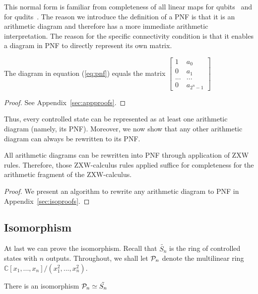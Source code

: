 This normal form is familiar from completeness of all linear maps for qubits~\cite{Hadzihasanovic2018zwzxcomplete} and for qudits~\cite{poor2023completeness}. The reason we introduce the definition of a PNF is that it is an arithmetic diagram and therefore has a more immediate arithmetic interpretation. The reason for the specific connectivity condition is that it enables a diagram in PNF to directly represent its own matrix.

\begin{prop}\label{prop:vec_pnf}
The diagram in equation (\ref{eq:pnf}) equals the matrix
    $\begin{bmatrix}
            1 &  a_0 \\ 0 & a_1 \\ ... & ... \\ 0 & a_{2^n-1}
        \end{bmatrix}$
\end{prop} 

\begin{proof}
    See Appendix~\ref{sec:appproofs}.
\end{proof}

Thus, every controlled state can be represented as at least one arithmetic diagram (namely, its PNF). Moreover, we now show that any other arithmetic diagram can always be rewritten to its PNF.


\begin{thm}\label{thm:uni_pnf}
    All arithmetic diagrams can be rewritten into PNF through application of ZXW rules. Therefore, those ZXW-calculus rules applied suffice for completeness for the arithmetic fragment of the ZXW-calculus.
\end{thm}

\begin{proof}
    We present an algorithm to rewrite any arithmetic diagram to PNF in Appendix~\ref{sec:isoproofs}.
\end{proof}

\subsection{Isomorphism}
At last we can prove the isomorphism. Recall that $\tilde{S_n}$ is the ring of controlled states with $n$ outputs. Throughout, we shall let $\mathcal{P}_{n}$ denote the multilinear ring $\mathbb{C}[x_1, ..., x_{n}]/(x_1^2, ..., x_{n}^2)$.

\begin{thm}\label{thm:iso}
    There is an isomorphism $\mathcal{P}_{n} \simeq \tilde{S_n}$
\end{thm}

